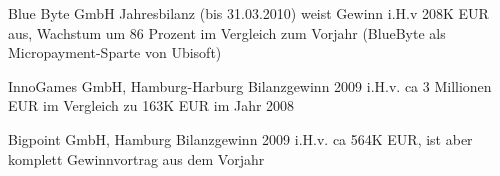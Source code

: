 Blue Byte GmbH\newline \newline
Jahresbilanz (bis 31.03.2010) weist Gewinn i.H.v 208K EUR aus, Wachstum um 86
Prozent im Vergleich zum Vorjahr  (BlueByte als Micropayment-Sparte von
Ubisoft)\newline 

InnoGames GmbH, Hamburg-Harburg\newline \newline
Bilanzgewinn 2009 i.H.v. ca 3 Millionen EUR im Vergleich zu 163K EUR im Jahr
2008\newline 

Bigpoint GmbH, Hamburg\newline \newline
Bilanzgewinn 2009 i.H.v. ca 564K EUR, ist aber komplett Gewinnvortrag aus dem
Vorjahr\newline
  
